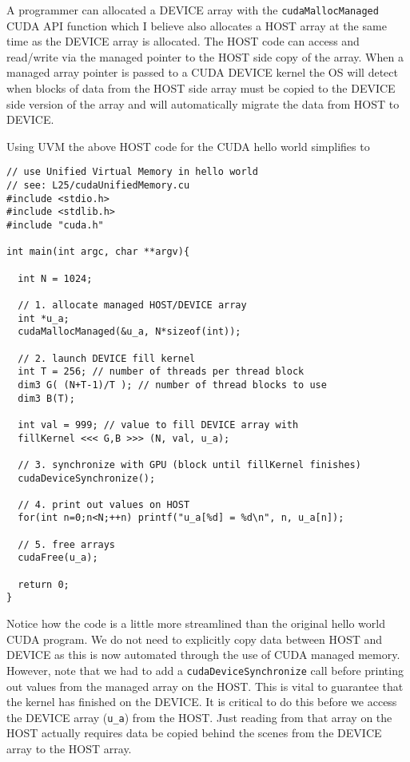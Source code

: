 A programmer can allocated a DEVICE array with the \texttt{cudaMallocManaged} CUDA API function which I believe also allocates a HOST array at the same time as the DEVICE array is allocated. The HOST code can access and read/write via the managed pointer to the HOST side copy of the array. When a managed array pointer is passed to a CUDA DEVICE kernel the OS will detect when blocks of data from the HOST side array must be copied to the DEVICE side version of the array and will automatically migrate the data from HOST to DEVICE. 

Using UVM the above HOST code for the CUDA hello world simplifies to

\begin{verbatim}
// use Unified Virtual Memory in hello world
// see: L25/cudaUnifiedMemory.cu
#include <stdio.h>
#include <stdlib.h>
#include "cuda.h"

int main(int argc, char **argv){

  int N = 1024;
 
  // 1. allocate managed HOST/DEVICE array
  int *u_a;
  cudaMallocManaged(&u_a, N*sizeof(int));

  // 2. launch DEVICE fill kernel   
  int T = 256; // number of threads per thread block
  dim3 G( (N+T-1)/T ); // number of thread blocks to use
  dim3 B(T);

  int val = 999; // value to fill DEVICE array with
  fillKernel <<< G,B >>> (N, val, u_a);

  // 3. synchronize with GPU (block until fillKernel finishes)
  cudaDeviceSynchronize();

  // 4. print out values on HOST    
  for(int n=0;n<N;++n) printf("u_a[%d] = %d\n", n, u_a[n]);

  // 5. free arrays               
  cudaFree(u_a);

  return 0;
}
\end{verbatim}
Notice how the code is a little more streamlined than the original hello world CUDA program. We do not need to explicitly copy data between HOST and DEVICE as this is now automated through the use of CUDA managed memory. However, note that we had to add a \texttt{cudaDeviceSynchronize} call before printing out values from the managed array on the HOST. This is vital to guarantee that the kernel has finished on the DEVICE. It is critical to do this before we access the DEVICE array (\texttt{u\_a}) from the HOST. Just reading from that array on the HOST actually requires data be copied behind the scenes from the DEVICE array to the HOST array.


